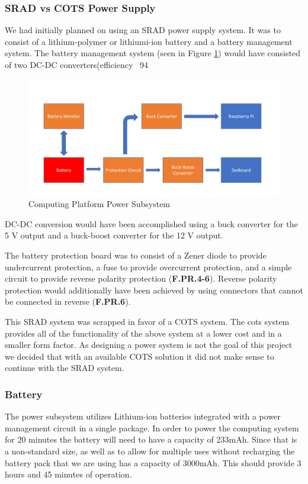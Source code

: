 \subsubsection{SRAD vs COTS Power Supply}
We had initially planned on using an SRAD power supply system. It was to consist of a lithium-polymer or lithiumi-ion battery and a battery management system. The battery management system (seen in Figure \ref{powerdiag}) would have consisted of two DC-DC converters(efficiency ~94%

\begin{figure}[H]
\centering
\includegraphics[width=15cm]{img/Power_Diagram.png}
\caption{Computing Platform Power Subsystem}
\label{powerdiag}
\end{figure}

DC-DC conversion would have been accomplished using a buck converter for the 5 V output and a buck-boost converter for the 12 V output. 

The battery protection board was to consist of a Zener diode to provide undercurrent protection, a fuse to provide overcurrent protection, and a simple circuit to provide reverse polarity protection (\textbf{F.PR.4-6}). Reverse polarity protection would additionally have been achieved by using connectors that cannot be connected in reverse (\textbf{F.PR.6}). 

This SRAD system was scrapped in favor of a COTS system. The cots system provides all of the functionality of the above system at a lower cost and in a smaller form factor. As designing a power system is not the goal of this project we decided that with an available COTS solution it did not make sense to continue with the SRAD system.

\subsubsection{Battery}
The power subsystem utilizes Lithium-ion batteries integrated with a power management circuit in a single package. In order to
power the computing system for 20 minutes the battery will need to have a capacity of 233mAh. Since that is a non-standard size, as well as to allow for multiple uses without recharging the battery pack that we are using has a capacity of 3000mAh. This should provide 3 hours and 45 minutes of operation.

